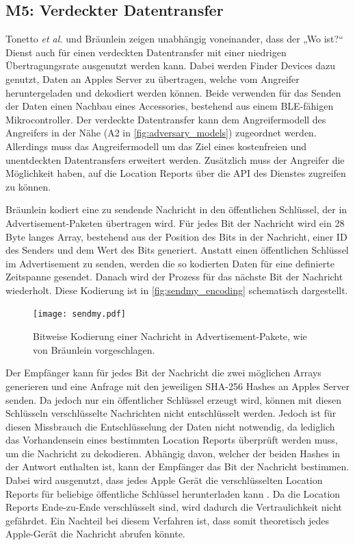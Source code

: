 \subsection[M5]{M5: Verdeckter Datentransfer}
\label{missbrauch:5}
Tonetto \textit{et al.} \cite{Tonetto_FindMy} und Bräunlein \cite{braeunlein_sendmy} zeigen unabhängig voneinander, dass der „Wo ist?“ Dienst auch für einen verdeckten Datentransfer mit einer niedrigen Übertragungsrate ausgenutzt werden kann.
Dabei werden Finder Devices dazu genutzt, Daten an Apples Server zu übertragen, welche vom Angreifer heruntergeladen und dekodiert werden können.
Beide verwenden für das Senden der Daten einen Nachbau eines Accessories, bestehend aus einem \ac{BLE}-fähigen Mikrocontroller.
Der verdeckte Datentransfer kann dem Angreifermodell des Angreifers in der Nähe (A2 in \autoref{fig:adversary_models}) zugeordnet werden.
Allerdings muss das Angreifermodell um das Ziel eines kostenfreien und unentdeckten Datentransfers erweitert werden.
Zusätzlich muss der Angreifer die Möglichkeit haben, auf die Location Reports über die \ac{API} des Dienstes zugreifen zu können.


Bräunlein \cite{braeunlein_sendmy} kodiert eine zu sendende Nachricht in den öffentlichen Schlüssel, der in Advertisement-Paketen übertragen wird.
Für jedes Bit der Nachricht wird ein 28 Byte langes Array, bestehend aus der Position des Bits in der Nachricht, einer ID des Senders und dem Wert des Bits generiert.
Anstatt einen öffentlichen Schlüssel im Advertisement zu senden, werden die so kodierten Daten für eine definierte Zeitspanne gesendet.
Danach wird der Prozess für das nächste Bit der Nachricht wiederholt.
Diese Kodierung ist in \autoref{fig:sendmy_encoding} schematisch dargestellt.
\begin{figure}[ht]
  \centering
  \texttt{[image: sendmy.pdf]}
  \caption{Bitweise Kodierung einer Nachricht in Advertisement-Pakete, wie von Bräunlein vorgeschlagen.}
  \label{fig:sendmy_encoding}
\end{figure}
Der Empfänger kann für jedes Bit der Nachricht die zwei möglichen Arrays generieren und eine Anfrage mit den jeweiligen \ac{SHA}-256 Hashes an Apples Server senden.
Da jedoch nur ein öffentlicher Schlüssel erzeugt wird, können mit diesen Schlüsseln verschlüsselte Nachrichten nicht entschlüsselt werden.
Jedoch ist für diesen Missbrauch die Entschlüsselung der Daten nicht notwendig, da lediglich das Vorhandensein eines bestimmten Location Reports überprüft werden muss, um die Nachricht zu dekodieren.
Abhängig davon, welcher der beiden Hashes in der Antwort enthalten ist, kann der Empfänger das Bit der Nachricht bestimmen.
Dabei wird ausgenutzt, dass jedes Apple Gerät die verschlüsselten Location Reports für beliebige öffentliche Schlüssel herunterladen kann \cite{Heinrich_OpenHaystack,braeunlein_sendmy}.
Da die Location Reports Ende-zu-Ende verschlüsselt sind, wird dadurch die Vertraulichkeit nicht gefährdet.
Ein Nachteil bei diesem Verfahren ist, dass somit theoretisch jedes Apple-Gerät die Nachricht abrufen könnte.

